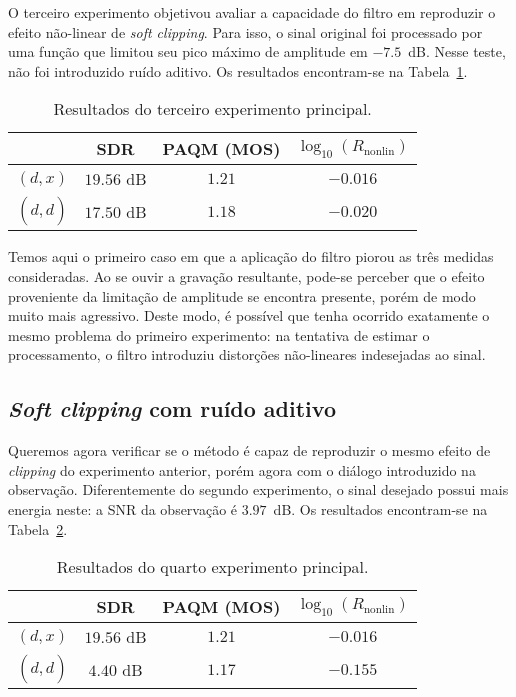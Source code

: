 O terceiro experimento objetivou avaliar a capacidade do filtro em reproduzir o efeito não-linear de \textit{soft clipping}. Para isso, o sinal original foi processado por uma função que limitou seu pico máximo de amplitude em $-7.5$~dB. Nesse teste, não foi introduzido ruído aditivo. Os resultados encontram-se na Tabela~\ref{tab:correntropy:experiment-3}.
{\def\arraystretch{1.25}\tabcolsep=10pt
\begin{table}[!ht]
    \centering
    \caption[Resultados do terceiro experimento: \textit{soft clipping}]{Resultados do terceiro experimento principal.}
    \label{tab:correntropy:experiment-3}
    \begin{tabular}{cccc}
        \toprule
                         & SDR        & PAQM (MOS)   & $\log_{10}(R_{\text{nonlin}})$ \\
        \midrule
        $(d, x)$       & $19.56$ dB & $1.21$  & $-0.016$                 \\
        $(d, \hat{d})$ & $17.50$ dB &  $1.18$  & $-0.020$                \\ \bottomrule
    \end{tabular}
\end{table}
}

Temos aqui o primeiro caso em que a aplicação do filtro piorou as três medidas consideradas. Ao se ouvir a gravação resultante, pode-se perceber que o efeito proveniente da limitação de amplitude se encontra presente, porém de modo muito mais agressivo. Deste modo, é possível que tenha ocorrido exatamente o mesmo problema do primeiro experimento: na tentativa de estimar o processamento, o filtro introduziu distorções não-lineares indesejadas ao sinal.

\subsection{\textit{Soft clipping} com ruído aditivo}

Queremos agora verificar se o método é capaz de reproduzir o mesmo efeito de \textit{clipping} do experimento anterior, porém agora com o diálogo introduzido na observação. Diferentemente do segundo experimento, o sinal desejado possui mais energia neste: a SNR da observação é $3.97$~dB. Os resultados encontram-se na Tabela~\ref{tab:correntropy:experiment-4}.
{\def\arraystretch{1.25}\tabcolsep=10pt
\begin{table}[!ht]
    \centering
    \caption[Resultados do quarto experimento: \textit{soft clipping} com ruído aditivo]{Resultados do quarto experimento principal.}
    \label{tab:correntropy:experiment-4}
    \begin{tabular}{cccc}
        \toprule
                         & SDR        & PAQM (MOS)   & $\log_{10}(R_{\text{nonlin}})$ \\
        \midrule
        $(d, x)$       & $19.56$ dB & $1.21$  & $-0.016$                 \\
        $(d, \hat{d})$ & $4.40$ dB & $1.17$  &  $-0.155$               \\ \bottomrule
    \end{tabular}
\end{table}
}

